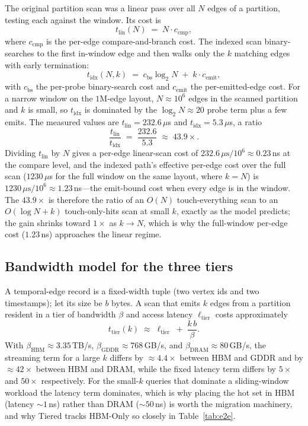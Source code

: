 \documentclass[10pt]{article}
\theoremstyle{definition}
\begin{document}
The original partition scan was a linear pass over all $N$ edges of a partition, testing each against the
window. Its cost is
\[
  t_{\mathrm{lin}}(N) \;=\; N\cdot c_{\mathrm{cmp}},
\]
where $c_{\mathrm{cmp}}$ is the per-edge compare-and-branch cost. The indexed scan binary-searches to the
first in-window edge and then walks only the $k$ matching edges with early termination:
\[
  t_{\mathrm{idx}}(N,k) \;=\; c_{\mathrm{bs}}\log_2 N \;+\; k\cdot c_{\mathrm{emit}},
\]
with $c_{\mathrm{bs}}$ the per-probe binary-search cost and $c_{\mathrm{emit}}$ the per-emitted-edge cost.
For a narrow window on the $1$M-edge layout, $N\approx 10^6$ edges in the scanned partition and $k$ is
small, so $t_{\mathrm{idx}}$ is dominated by the $\log_2 N\approx 20$ probe term plus a few emits. The
measured values are $t_{\mathrm{lin}}=232.6\,\mu$s and $t_{\mathrm{idx}}=5.3\,\mu$s, a ratio
\[
  \frac{t_{\mathrm{lin}}}{t_{\mathrm{idx}}} \;=\; \frac{232.6}{5.3} \;\approx\; \mathbf{43.9\times}.
\]
Dividing $t_{\mathrm{lin}}$ by $N$ gives a per-edge linear-scan cost of $232.6\,\mu\mathrm{s}/10^6\approx
0.23\,$ns at the compare level, and the indexed path's effective per-edge cost over the full scan
($1230\,\mu$s for the full window on the same layout, where $k=N$) is
$1230\,\mu\mathrm{s}/10^6\approx 1.23\,$ns---the emit-bound cost when every edge is in the window. The
$43.9\times$ is therefore the ratio of an $O(N)$ touch-everything scan to an $O(\log N + k)$ touch-only-hits
scan at small $k$, exactly as the model predicts; the gain shrinks toward $1\times$ as $k\to N$, which is why
the full-window per-edge cost ($1.23$\,ns) approaches the linear regime.

\subsection{Bandwidth model for the three tiers}

A temporal-edge record is a fixed-width tuple (two vertex ids and two timestamps); let its size be $b$ bytes.
A scan that emits $k$ edges from a partition resident in a tier of bandwidth $\beta$ and access latency
$\ell_{\mathrm{tier}}$ costs approximately
\[
  t_{\mathrm{tier}}(k) \;\approx\; \ell_{\mathrm{tier}} \;+\; \frac{k\,b}{\beta}.
\]
With $\beta_{\mathrm{HBM}}\approx 3.35$\,TB/s, $\beta_{\mathrm{GDDR}}\approx 768$\,GB/s, and
$\beta_{\mathrm{DRAM}}\approx 80$\,GB/s, the streaming term for a large $k$ differs by $\approx 4.4\times$
between HBM and GDDR and by $\approx 42\times$ between HBM and DRAM, while the fixed latency term differs by
$5\times$ and $50\times$ respectively. For the small-$k$ queries that dominate a sliding-window workload the
latency term dominates, which is why placing the hot set in HBM (latency ${\sim}1$\,ns) rather than DRAM
(${\sim}50$\,ns) is worth the migration machinery, and why Tiered tracks HBM-Only so closely in
Table~\ref{tab:e2e}.
\end{document}
